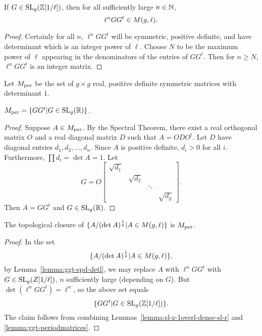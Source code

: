 \documentclass{amsart}
\begin{document}
\begin{lemma}\label{lemma:ggt-spd-detl}
  If $G \in \operatorname{SL}_g(\mathbb{Z}[1/\ell])$, then for all sufficiently large $n \in \mathbb{N}$,
  \[
    \ell^n GG^t \in M(g,\ell).
  \]
\end{lemma}

\begin{proof}
  Certainly for all $n$, $\ell^n GG^t$ will be symmetric, positive definite, and have determinant which is an integer power of $\ell$. Choose $N$ to be the maximum power of $\ell$ appearing in the denominators of the entries of $GG^t$. Then for $n \geq N$, $\ell^n GG^t$ is an integer matrix.
\end{proof}


\begin{definition}
  Let $M_{\textrm{per}}$ be the set of $g \times g$ real, positive definite symmetric matrices  with determinant $1$.
\end{definition}

\begin{lemma}\label{lemma:ggt-periodmatrices}
  $M_{\textrm{per}} = \{GG^t | G \in \operatorname{SL}_g(\mathbb{R})\}$.
\end{lemma}

\begin{proof}
  Suppose $A \in M_{\textrm{per}}$. By the Spectral Theorem, there exist a real orthogonal matrix $O$ and a real diagonal matrix $D$ such that $A = ODO^t$. Let $D$ have diagonal entries $d_1, d_2, \dots, d_n$. Since $A$ is positive definite, $d_i > 0$ for all $i$. Furthermore, $\prod d_i = \det A = 1$. Let
  \[
    G = O
    \begin{bmatrix}
      \sqrt{d_1} & & & \\
      & \sqrt{d_2} & & \\
      & & \ddots & \\
      & & & \sqrt{d_{g}}
    \end{bmatrix}.
\]
Then $A = GG^t$ and $G \in \operatorname{SL}_g(\mathbb{R})$.
\end{proof}

\begin{proposition}\label{prop:A-over-detA}
  The topological closure of ${\{A/(\det A)^{\frac{1}{g}} | A \in M(g,\ell)\}}$ is $M_{\textrm{per}}$.
\end{proposition}

\begin{proof}
  In the set
  \[
    \{A/(\det A)^{\frac{1}{g}} | A \in M(g,\ell)\},
  \]
  by Lemma~\ref{lemma:ggt-spd-detl}, we may replace $A$ with $\ell^n GG^t$ with $G \in \operatorname{SL}_g(Z[1/\ell])$, $n$ sufficiently large (depending on $G$). But $\det (\ell^n GG^t) = \ell^n$, so the above set equals
  \[
    \{GG^t | G \in \operatorname{SL}_g(\mathbb{Z}[1/\ell])\}.
  \]
  The claim follows from combining Lemmas~\ref{lemma:sl-z-1overl-dense-sl-r} and \ref{lemma:ggt-periodmatrices}.
\end{proof}
\end{document}
